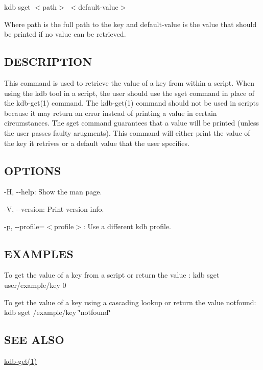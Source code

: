 {\ttfamily kdb sget $<$path$>$ $<$default-\/value$>$}

Where {\ttfamily path} is the full path to the key and {\ttfamily default-\/value} is the value that should be printed if no value can be retrieved.

\subsection*{D\+E\+S\+C\+R\+I\+P\+T\+I\+O\+N}

This command is used to retrieve the value of a key from within a script. When using the kdb tool in a script, the user should use the {\ttfamily sget} command in place of the kdb-\/get(1) command. The kdb-\/get(1) command should not be used in scripts because it may return an error instead of printing a value in certain circumstances. The {\ttfamily sget} command guarantees that a value will be printed (unless the user passes faulty arugments). This command will either print the value of the key it retrives or a default value that the user specifies.

\subsection*{O\+P\+T\+I\+O\+N\+S}


\begin{DoxyItemize}
\item {\ttfamily -\/\+H}, {\ttfamily -\/-\/help}\+: Show the man page.
\item {\ttfamily -\/\+V}, {\ttfamily -\/-\/version}\+: Print version info.
\item {\ttfamily -\/p}, {\ttfamily -\/-\/profile}=$<$profile$>$\+: Use a different kdb profile.
\end{DoxyItemize}

\subsection*{E\+X\+A\+M\+P\+L\+E\+S}

To get the value of a key from a script or return the value {}\+: {\ttfamily kdb sget user/example/key 0}

To get the value of a key using a cascading lookup or return the value {\ttfamily notfound}\+: {\ttfamily kdb sget /example/key \char`\"{}notfound\char`\"{}}

\subsection*{S\+E\+E A\+L\+S\+O}


\begin{DoxyItemize}
\item \hyperlink{md_doc_help_kdb-get_doc_help_kdb-get_md}{kdb-\/get(1)} 
\end{DoxyItemize}